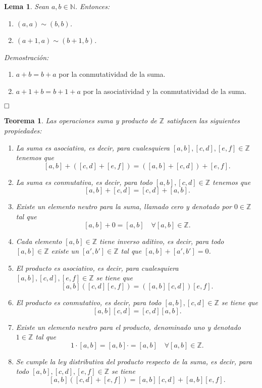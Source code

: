 \documentclass[12pt]{article}
\newtheorem{theorem}{Teorema}[section]
\newtheorem{lemma}{Lema}[theorem]
\begin{document}
\begin{lemma}Sean $a,b \in \mathbb{N}$. Entonces:
\begin{enumerate}
\item $(a,a) \sim (b,b)$.
\item $(a+1,a) \sim (b+1,b)$.
\end{enumerate}
\end{lemma}
\emph{Demostración: }
\begin{enumerate}
\item $a+b=b+a$ por la conmutatividad de la suma.
\item $a+1+b = b+1+a$ por la asociatividad y la conmutatividad de la suma.
\end{enumerate}

$\hfill \square$

\begin{theorem}
Las operaciones suma y producto de $\mathbb{Z}$ satisfacen las siguientes propiedades:
\begin{enumerate}
\item La suma es asociativa, es decir, para cualesquiera $[a,b],[c,d],[e,f] \in \mathbb{Z}$ tenemos que $$[a,b]+([c,d]+[e,f])=([a,b]+[c,d])+[e,f].$$
\item La suma es conmutativa, es decir, para todo $[a,b],[c,d] \in \mathbb{Z}$ tenemos que $$[a,b]+[c,d]=[c,d]+[a,b].$$
\item Existe un elemento neutro para la suma, llamado cero y denotado por $0 \in \mathbb{Z}$ tal que $$[a,b]+0 = [a,b] \quad \forall [a,b] \in \mathbb{Z}.$$
\item Cada elemento $[a,b] \in \mathbb{Z}$ tiene inverso aditivo, es decir, para todo $[a,b] \in \mathbb{Z}$ existe un $[a',b'] \in \mathbb{Z}$ tal que $[a,b]+[a',b'] = 0$.
\item El producto es asociativo, es decir, para cualesquiera $[a,b],[c,d],[e,f] \in \mathbb{Z}$ se tiene que $$[a,b]([c,d][e,f])=([a,b][c,d])[e,f].$$
\item El producto es conmutativo, es decir, para todo $[a,b], [c,d] \in \mathbb{Z}$ se tiene que $$[a,b][c,d] = [c,d][a,b].$$
\item Existe un elemento neutro para el producto, denominado uno y denotado $1 \in \mathbb{Z}$ tal que $$1\cdot[a,b] = [a,b] \cdot = [a,b] \quad \forall [a,b] \in \mathbb{Z}.$$
\item Se cumple la ley distributiva del producto respecto de la suma, es decir, para todo $[a,b],[c,d],[e,f] \in \mathbb{Z}$ se tiene $$[a,b]([c,d]+[e,f])=[a,b][c,d]+[a,b][e,f].$$
\end{enumerate}
\end{theorem}
\end{document}
